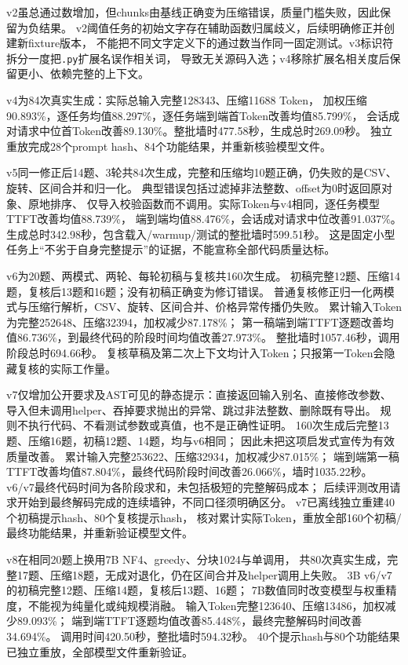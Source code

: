\documentclass[UTF8,a4paper,11pt,fontset=fandol]{ctexart}
\begin{document}
v2虽总通过数增加，但chunks由基线正确变为压缩错误，质量门槛失败，因此保留为负结果。
v2阈值任务的初始文字存在辅助函数归属歧义，后续明确修正并创建新fixture版本，
不能把不同文字定义下的通过数当作同一固定测试。v3标识符拆分一度把\texttt{.py}扩展名误作相关词，
导致无关源码入选；v4移除扩展名相关度后保留更小、依赖完整的上下文。

v4为84次真实生成：实际总输入完整128343、压缩11688 Token，
加权压缩90.893\%，逐任务均值88.297\%，逐任务端到端首Token改善均值85.799\%，
会话成对请求中位首Token改善89.130\%。整批墙时477.58秒，生成总时269.09秒。
独立重放完成28个prompt hash、84个功能结果，并重新核验模型文件。

v5同一修正后14题、3轮共84次生成，完整和压缩均10题正确，仍失败的是CSV、旋转、区间合并和归一化。
典型错误包括过滤掉非法整数、offset为0时返回原对象、原地排序、
仅导入校验函数而不调用。实际Token与v4相同，逐任务模型TTFT改善均值88.739\%，
端到端均值88.476\%，会话成对请求中位改善91.037\%。
生成总时342.98秒，包含载入/warmup/测试的整批墙时599.51秒。
这是固定小型任务上“不劣于自身完整提示”的证据，不能宣称全部代码质量达标。

v6为20题、两模式、两轮、每轮初稿与复核共160次生成。
初稿完整12题、压缩14题，复核后13题和16题；没有初稿正确变为修订错误。
普通复核修正归一化两模式与压缩行解析，CSV、旋转、区间合并、价格异常传播仍失败。
累计输入Token为完整252648、压缩32394，加权减少87.178\%；
第一稿端到端TTFT逐题改善均值86.736\%，到最终代码的阶段时间均值改善27.973\%。
整批墙时1057.46秒，调用阶段总时694.66秒。
复核草稿及第二次上下文均计入Token；只报第一Token会隐藏复核的实际工作量。

v7仅增加公开要求及AST可见的静态提示：直接返回输入别名、直接修改参数、
导入但未调用helper、吞掉要求抛出的异常、跳过非法整数、删除既有导出。
规则不执行代码、不看测试参数或真值，也不是正确性证明。
160次生成后完整13题、压缩16题，初稿12题、14题，均与v6相同；
因此未把这项启发式宣传为有效质量改善。
累计输入完整253622、压缩32934，加权减少87.015\%；
端到端第一稿TTFT改善均值87.804\%，最终代码阶段时间改善26.066\%，墙时1035.22秒。
v6/v7最终代码时间为各阶段求和，未包括极短的完整解码成本；
后续评测改用请求开始到最终解码完成的连续墙钟，不同口径须明确区分。
v7已离线独立重建40个初稿提示hash、80个复核提示hash，
核对累计实际Token，重放全部160个初稿/最终功能结果，并重新验证模型文件。

v8在相同20题上换用7B NF4、greedy、分块1024与单调用，
共80次真实生成，完整17题、压缩18题，无成对退化，仍在区间合并及helper调用上失败。
3B v6/v7的初稿完整12题、压缩14题，复核后13题、16题；
7B数值同时改变模型与权重精度，不能视为纯量化或纯规模消融。
输入Token完整123640、压缩13486，加权减少89.093\%；
端到端TTFT逐题均值改善85.448\%，最终完整解码时间改善34.694\%。
调用时间420.50秒，整批墙时594.32秒。
40个提示hash与80个功能结果已独立重放，全部模型文件重新验证。
\end{document}
